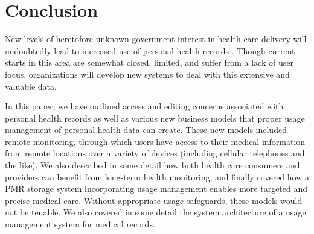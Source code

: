 \documentclass[10pt, conference, compsocconf]{IEEEtran}
\begin{document}
%





\section{Conclusion}
New levels of heretofore unknown government interest in health care delivery will undoubtedly lead to increased use of personal health records \cite{Emr:Web:Recovery}.  Though current starts in this area are somewhat closed, limited, and suffer from a lack of user focus, organizations will develop new systems to deal with this extensive and valuable data.

In this paper, we have outlined access and editing concerns associated with personal health records as well as various new business models that proper usage management of personal health data can create.  These new models included remote monitoring, through which users have access to their medical information from remote locations over a variety of devices (including cellular telephones and the like).  We also described in some detail how both health care consumers and providers can benefit from long-term health monitoring, and finally covered how a PMR storage system incorporating usage management enables more targeted and precise medical care.  Without appropriate usage safeguards, these models would not be tenable.  We also covered in some detail the system architecture of a usage management system for medical records.
\end{document}
